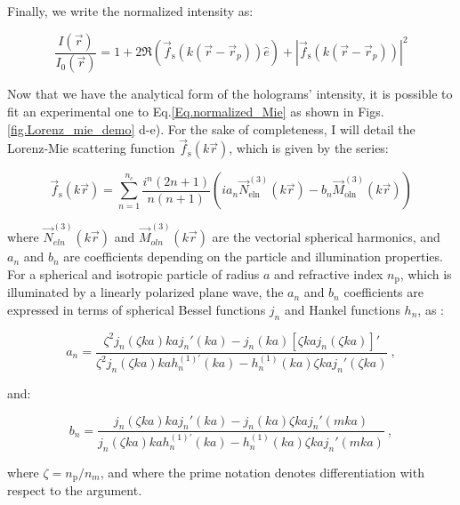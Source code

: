  Finally, we write the normalized intensity as:

\begin{equation}
	\frac{I(\vec{r})}{I_0(\vec{r})} = 1 + 2 \Re 
	\left(  
		\vec{f}_\mathrm{s}(k(\vec{r}- \vec{r}_p)) \hat{e}
	\right)
	+
	|
		\vec{f}_\mathrm{s}(k(\vec{r}- \vec{r}_p))
	|^2
	\label{Eq.normalized_Mie}	
\end{equation}


Now that we have the analytical form of the holograms' intensity, it is possible to fit an experimental one to Eq.\ref{Eq.normalized_Mie} as shown in Figs.\ref{fig.Lorenz_mie_demo} d-e). For the sake of completeness, I will detail the Lorenz-Mie scattering function $\vec{f}_\mathrm{s}(k\vec{r})$, which is given by the series:

\begin{equation}
	\vec{f}_\mathrm{s}(k \vec{r}) = \sum _{n=1} ^{n_c} 
	\frac
	{
		i^n (2n +1)
	}
	{
		n(n+1)
	}
	\left(
		i a_n \vec{N}^{(3)}_\mathrm{eln}(k\vec{r})
		-
		b_n \vec{M}^{(3)}_\mathrm{oln}(k\vec{r})
	\right)
	\label{Eq.Lorenz-Mie-function}
\end{equation} 


where $\vec{N}^{(3)}_{eln}(k\vec{r})$ and $\vec{M}^{(3)}_{oln}(k\vec{r})$ are the vectorial spherical harmonics, and $a_n$ and $b_n$ are coefficients depending on the particle and illumination properties. For a spherical and isotropic particle of radius $a$ and refractive index $n_\mathrm{p}$, which is illuminated by a linearly polarized plane wave, the $a_n$ and $b_n$ coefficients are expressed in terms of spherical Bessel functions $j_n$ and Hankel functions $h_n$, as \cite{f_bohren_absorption_1998}:

\begin{equation}
	a_n = 
	\frac
	{
		\zeta^2 j_n (\zeta k a)k a j_n' (k a) - j_n(ka)[\zeta kaj_n(\zeta ka)]'
	}
	{
		\zeta^2 j_n (\zeta k a)k a h_n^{(1)'} (k a) - h_n^{(1)}(ka)\zeta kaj_n'(\zeta ka)
	} ~,
	\label{Eq:an}
\end{equation}

and:

\begin{equation}
	b_n =
	\frac
	{
		j_n(\zeta k a) kaj_n'(ka) - j_n (ka) \zeta kaj_n'(mka)
	}
	{
		j_n(\zeta k a) kah_n^{(1)'}(ka) - h_n^{(1)} (ka) \zeta kaj_n '(mka)
	} ~,
	\label{Eq:bn}
\end{equation}


where $\zeta = n_\mathrm{p} / n_m $, and where the prime notation denotes differentiation with respect to the argument. 
	
